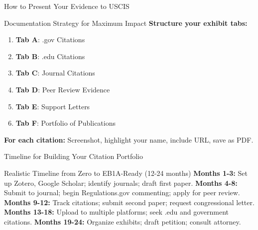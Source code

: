 \documentclass[11pt]{beamer}
\begin{document}
	\begin{frame}{How to Present Your Evidence to USCIS}
		\small
		\begin{block}{Documentation Strategy for Maximum Impact}
			\textbf{Structure your exhibit tabs:}
			\begin{enumerate}
				\item \textbf{Tab A}: .gov Citations
				\item \textbf{Tab B}: .edu Citations
				\item \textbf{Tab C}: Journal Citations
				\item \textbf{Tab D}: Peer Review Evidence
				\item \textbf{Tab E}: Support Letters
				\item \textbf{Tab F}: Portfolio of Publications
			\end{enumerate}
			\textbf{For each citation:} Screenshot, highlight your name, include URL, save as PDF.
		\end{block}
	\end{frame}
	
	\begin{frame}{Timeline for Building Your Citation Portfolio}
		\small
		\begin{block}{Realistic Timeline from Zero to EB1A-Ready (12-24 months)}
			\textbf{Months 1-3:} Set up Zotero, Google Scholar; identify journals; draft first paper.
			\vspace{0.1cm}
			\textbf{Months 4-8:} Submit to journal; begin Regulations.gov commenting; apply for peer review.
			\vspace{0.1cm}
			\textbf{Months 9-12:} Track citations; submit second paper; request congressional letter.
			\vspace{0.1cm}
			\textbf{Months 13-18:} Upload to multiple platforms; seek .edu and government citations.
			\vspace{0.1cm}
			\textbf{Months 19-24:} Organize exhibits; draft petition; consult attorney.
		\end{block}
	\end{frame}
	
\end{document}
